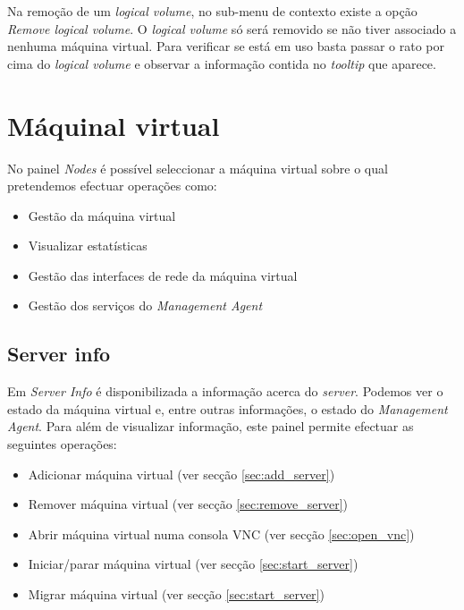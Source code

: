 Na remoção de um \emph{logical volume}, no sub-menu de contexto existe a opção \emph{Remove logical volume}. O \emph{logical volume} só será removido se não tiver associado a nenhuma máquina virtual. Para verificar se está em uso basta passar o rato por cima do \emph{logical volume} e observar a informação contida no \emph{tooltip} que aparece.

\pagebreak

\section{Máquinal virtual}
\label{sec:server}

No painel \emph{Nodes} é possível seleccionar a máquina virtual sobre o qual pretendemos efectuar operações como:

\begin{itemize}
        \item Gestão da máquina virtual
        \item Visualizar estatísticas
        \item Gestão das interfaces de rede da máquina virtual
        \item Gestão dos serviços do \emph{Management Agent}
\end{itemize}

\subsection{Server info}
Em \emph{Server Info} é disponibilizada a informação acerca do \emph{server}. Podemos ver o estado da máquina virtual e, entre outras informações, o estado do \emph{Management Agent}.
Para além de visualizar informação, este painel permite efectuar as seguintes operações:
\begin{itemize}
	\item Adicionar máquina virtual (ver secção \ref{sec:add_server})
	\item Remover máquina virtual (ver secção \ref{sec:remove_server})
	\item Abrir máquina virtual numa consola VNC (ver secção \ref{sec:open_vnc})
	\item Iniciar/parar máquina virtual (ver secção \ref{sec:start_server})
    \item Migrar máquina virtual (ver secção \ref{sec:start_server})
\end{itemize}

